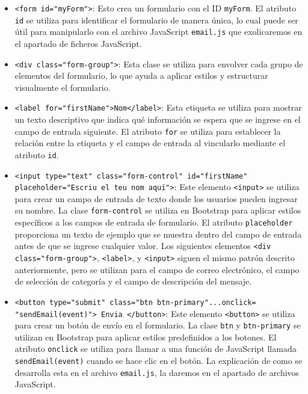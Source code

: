 \documentclass{article}
\begin{document}
\begin{itemize}
\begin{itemize}
        \item  \texttt{<form id="myForm">}: Esto crea un formulario con el ID \texttt{myForm}. El atributo \texttt{id} se utiliza para identificar el formulario de manera única, lo cual puede ser útil para manipularlo con el archivo JavaScript \texttt{email.js} que exolicaremos en el apartado de ficheros JavaScript.

        \item  \texttt{<div class="form-group">}: Esta clase se utiliza para envolver cada grupo de elementos del formulario, lo que ayuda a aplicar estilos y estructurar visualmente el formulario.

        \item  \texttt{<label for="firstName">Nom</label>}: Esta etiqueta se utiliza para mostrar un texto descriptivo que indica qué información se espera que se ingrese en el campo de entrada siguiente. El atributo \texttt{for} se utiliza para establecer la relación entre la etiqueta y el campo de entrada al vincularlo mediante el atributo \texttt{id}.

        \item  \texttt{<input type="text" class="form-control" id="firstName" placeholder="Escriu el teu nom aquí">}: Este elemento \texttt{<input>} se utiliza para crear un campo de entrada de texto donde los usuarios pueden ingresar su nombre. La clase \texttt{form-control} se utiliza en Bootstrap para aplicar estilos específicos a los campos de entrada de formulario. El atributo \texttt{placeholder} proporciona un texto de ejemplo que se muestra dentro del campo de entrada antes de que se ingrese cualquier valor. Los siguientes elementos \texttt{<div class="form-group">}, \texttt{<label>}, y \texttt{<input>} siguen el mismo patrón descrito anteriormente, pero se utilizan para el campo de correo electrónico, el campo de selección de categoría y el campo de descripción del mensaje.

        \item \texttt{<button type="submit" class="btn btn-primary"...onclick= "sendEmail(event)"> Envia </button>}: Este elemento \texttt{<button>} se utiliza para crear un botón de envío en el formulario. La clase \texttt{btn} y \texttt{btn-primary} se utilizan en Bootstrap para aplicar estilos predefinidos a los botones. El atributo \texttt{onclick} se utiliza para llamar a una función de JavaScript llamada \texttt{sendEmail(event)} cuando se hace clic en el botón. La explicación de como se desarrolla esta en el archivo \texttt{email.js}, la daremos en el apartado de archivos JavaScript.
    \end{itemize} 
\end{itemize}
\end{document}
